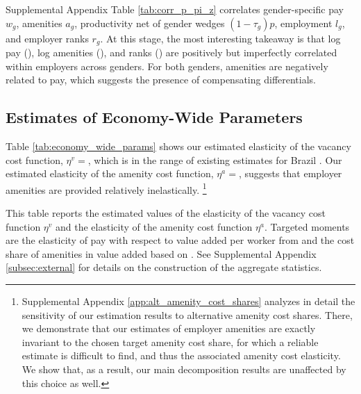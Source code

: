 Supplemental Appendix Table \ref{tab:corr_p_pi_z} correlates gender-specific pay $w_{g}$, amenities $a_{g}$, productivity net of gender wedges $(1 - \tau_{g})p$, employment $l_{g}$, and employer ranks $r_{g}$. %
%
At this stage, the most interesting takeaway is that log pay (), log amenities (), and ranks () are positively but imperfectly correlated within employers across genders. For both genders, amenities are negatively related to pay, which suggests the presence of compensating differentials.


\subsection{Estimates of Economy-Wide Parameters\label{subsec:estimates_economy_wide_params}}

Table \ref{tab:economy_wide_params} shows our estimated elasticity of the vacancy cost function, $\eta^{v} = $, which is in the range of existing estimates for Brazil \citep{EngbomMoser2022a}. Our estimated elasticity of the amenity cost function, $\eta^{a} = $, suggests that employer amenities are provided relatively inelastically.%
%
\footnote{\label{revision_2:editor_comment_5}Supplemental Appendix \ref{app:alt_amenity_cost_shares} analyzes in detail the sensitivity of our estimation results to alternative amenity cost shares. There, we demonstrate that our estimates of employer amenities are exactly invariant to the chosen target amenity cost share, for which a reliable estimate is difficult to find, and thus the associated amenity cost elasticity. We show that, as a result, our main decomposition results are unaffected by this choice as well.} %
%

%
\begin{table}[htbp!]
    \caption{Estimates of economy-wide parameters}
    \label{tab:economy_wide_params}
    \resizebox{\textwidth}{!}{%
    
    }
    \begin{tablenotes}
        \footnotesize
        This table reports the estimated values of the elasticity of the vacancy cost function $\eta^{v}$ and the elasticity of the amenity cost function $\eta^{a}$. Targeted moments are the elasticity of pay with respect to value added per worker from \citet{AlvarezBenguriaEngbomMoser2018} and the cost share of amenities in value added based on \citet{BieriKuminoffPope2023}. See Supplemental Appendix \ref{subsec:external} for details on the construction of the aggregate statistics. %
    \end{tablenotes}
    \begin{tablenotes}[Source]
        \sourcemodel%
    \end{tablenotes}
\end{table}
%


